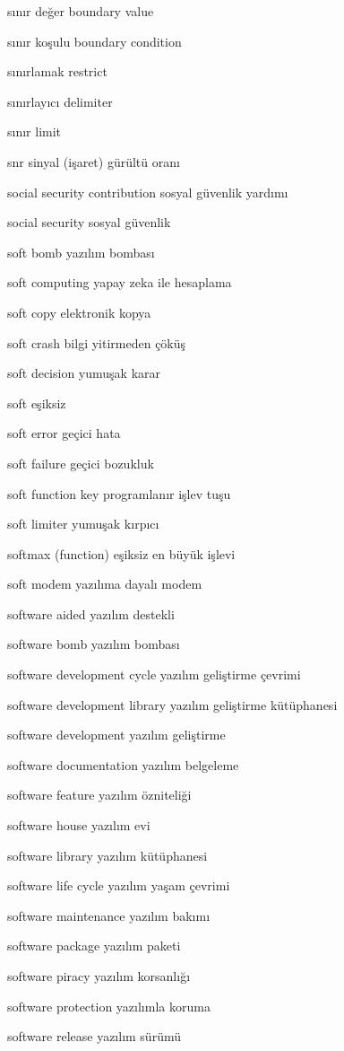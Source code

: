 \documentclass[12pt,fleqn]{article}\usepackage{../../common}
\begin{document}
sınır değer boundary value

sınır koşulu boundary condition

sınırlamak restrict

sınırlayıcı delimiter

sınır limit

snr sinyal (işaret) gürültü oranı

social security contribution sosyal güvenlik yardımı

social security sosyal güvenlik

soft bomb yazılım bombası

soft computing yapay zeka ile hesaplama

soft copy elektronik kopya

soft crash bilgi yitirmeden çöküş

soft decision yumuşak karar

soft eşiksiz

soft error geçici hata

soft failure geçici bozukluk

soft function key programlanır işlev tuşu

soft limiter yumuşak kırpıcı

softmax (function) eşiksiz en büyük işlevi

soft modem yazılıma dayalı modem

software aided yazılım destekli

software bomb yazılım bombası

software development cycle yazılım geliştirme çevrimi

software development library yazılım geliştirme kütüphanesi

software development yazılım geliştirme

software documentation yazılım belgeleme

software feature yazılım özniteliği

software house yazılım evi

software library yazılım kütüphanesi

software life cycle yazılım yaşam çevrimi

software maintenance yazılım bakımı

software package yazılım paketi

software piracy yazılım korsanlığı

software protection yazılımla koruma

software release yazılım sürümü
\end{document}
